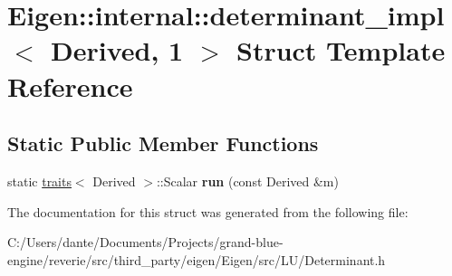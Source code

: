 \hypertarget{struct_eigen_1_1internal_1_1determinant__impl_3_01_derived_00_011_01_4}{}\section{Eigen\+::internal\+::determinant\+\_\+impl$<$ Derived, 1 $>$ Struct Template Reference}
\label{struct_eigen_1_1internal_1_1determinant__impl_3_01_derived_00_011_01_4}
\subsection*{Static Public Member Functions}
\begin{DoxyCompactItemize}
\item 
\mbox{\label{struct_eigen_1_1internal_1_1determinant__impl_3_01_derived_00_011_01_4_a17a08ce77c44a521ab5eb242e00c75e2}} 
static \mbox{\hyperlink{struct_eigen_1_1internal_1_1traits}{traits}}$<$ Derived $>$\+::Scalar {\bfseries run} (const Derived \&m)
\end{DoxyCompactItemize}


The documentation for this struct was generated from the following file\+:\begin{DoxyCompactItemize}
\item 
C\+:/\+Users/dante/\+Documents/\+Projects/grand-\/blue-\/engine/reverie/src/third\+\_\+party/eigen/\+Eigen/src/\+L\+U/Determinant.\+h\end{DoxyCompactItemize}
